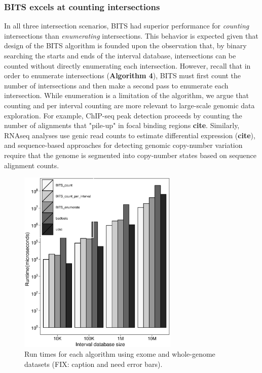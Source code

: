 \documentclass{bioinfo}
\begin{document}
	\subsubsection{BITS excels at counting intersections}
	In all three intersection scenarios, BITS had superior performance for \emph{counting} intersections
	than \emph{enumerating} intersections. This behavior is expected given that design of the BITS algorithm
	is founded upon the observation that, by binary searching the starts and ends of the interval database, 
	intersections can be counted without directly enumerating each intersection. However, recall that in order to enumerate
	intersections (\textbf{Algorithm 4}), BITS must first count the number of intersections and then make 
	a second pass to enumerate each intersection. While enumeration is a limitation of the algorithm, 
	we argue that counting and per interval counting are more relevant to large-scale genomic data exploration. 
	For example, ChIP-seq peak detection proceeds by counting the number of alignments that "pile-up" in focal binding regions \textbf{cite}.
	Similarly, RNAseq analyses use genic read counts to estimate differential expression (\textbf{cite}), and sequence-based 
	approaches for detecting genomic copy-number variation require that the genome is segmented into copy-number states based
	on sequence alignment counts.
	
	\begin{figure}[h]
		\centering
		\includegraphics[width=3in]{figures/genome-v-exome.eps}
		\caption[]{Run times for each algorithm using exome and whole-genome datasets (FIX: caption and need error bars).}
	\end{figure}
	
\end{document}
